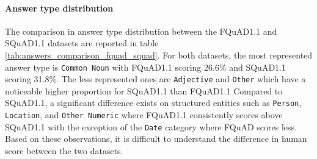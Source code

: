 \documentclass{article}
\begin{document}
\paragraph{Answer type distribution}{
The comparison in answer type distribution between the FQuAD1.1 and SQuAD1.1 datasets are reported in table \ref{tab:answers_comparison_fquad_squad}.
For both datasets, the most represented answer type is \texttt{Common Noun} with FQuAD1.1 scoring 26.6\% and SQuAD1.1 scoring 31.8\%. 
The less represented ones are \texttt{Adjective} and \texttt{Other} which have a noticeable higher proportion for SQuAD1.1 than FQuAD1.1
Compared to SQuAD1.1, a significant difference exists on structured entities such as \texttt{Person}, \texttt{Location}, and \texttt{Other Numeric} where FQuAD1.1 consistently scores above SQuAD1.1 with the exception of the \texttt{Date} category where FQuAD scores less.
Based on these observations, it is difficult to understand the difference in human score between the two datasets.
}

\begin{table}[ht]
    \centering
    \caption{Answer type comparison for the development sets of FQuAD1.1 and SQuAD1.1}
    \label{tab:answers_comparison_fquad_squad}
\end{table}
\end{document}
